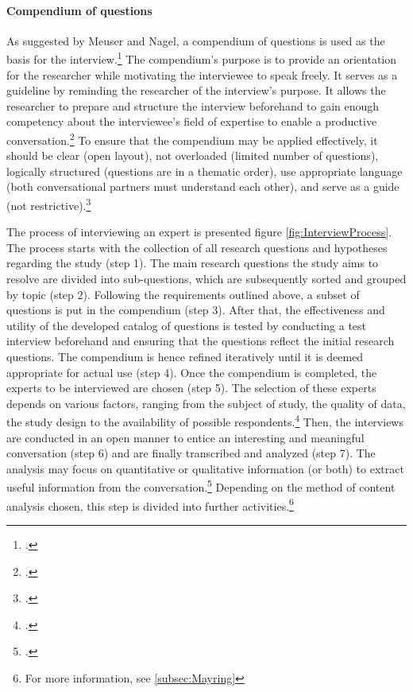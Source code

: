 \paragraph{Compendium of questions} As suggested by Meuser and Nagel, a compendium of questions is used as the basis for the interview.\footcite[Cf.][p.472]{MeuserExperteninterviewkonzeptionelleGrundlagen2009} The compendium's purpose is to provide an orientation for the researcher while motivating the interviewee to speak freely. It serves as a guideline by reminding the researcher of the interview's purpose. It allows the researcher to prepare and structure the interview beforehand to gain enough competency about the interviewee's field of expertise to enable a productive conversation.\footcites[Cf.][p.472 et seqq]{MeuserExperteninterviewkonzeptionelleGrundlagen2009}[cf.][p.133]{KrugerMethodennaturwissenschaftsdidaktischenForschung2014}[cf.][p.431 et seq]{BognerInterviewsmitExperten2014}[cf.][p.123 et seqq]{NiebertLeitfadengestutzteInterviews2014}[cf.][p.421]{AghamanoukjanQualitativeInterviews2007}
To ensure that the compendium may be applied effectively, it should be clear (open layout), not overloaded (limited number of questions), logically structured (questions are in a thematic order), use appropriate language (both conversational partners must understand each other), and serve as a guide (not restrictive).\footcite[Cf.][p.126]{NiebertLeitfadengestutzteInterviews2014}

The process of interviewing an expert is presented figure \ref{fig:InterviewProcess}. The process starts with the collection of all research questions and hypotheses regarding the study (step 1). The main research questions the study aims to resolve are divided into sub-questions, which are subsequently sorted and grouped by topic (step 2). Following the requirements outlined above, a subset of questions is put in the compendium (step 3). After that, the effectiveness and utility of the developed catalog of questions is tested by conducting a test interview beforehand and ensuring that the questions reflect the initial research questions. The compendium is hence refined iteratively until it is deemed appropriate for actual use (step 4). Once the compendium is completed, the experts to be interviewed are chosen (step 5). The selection of these experts depends on various factors, ranging from the subject of study, the quality of data, the study design to the availability of possible respondents.\footcites[Cf.][p.134]{KrugerqualitativeInhaltsanalyseMethode2004}[cf.][p.1 et seq.]{MorseDeterminingsamplesize2000}[cf.][p.137]{Flickintroductionqualitativeresearch2009} Then, the interviews are conducted in an open manner to entice an interesting and meaningful conversation (step 6) and are finally transcribed and analyzed (step 7). The analysis may focus on quantitative or qualitative information (or both) to extract useful information from the conversation.\footcites[Cf.][p.37 et seqq]{BognerInterviewsmitExperten2014}[cf.][p.454 et seqq]{MeuserExperteninterviewkonzeptionelleGrundlagen2009}[cf.][p.72]{MasonQualitativeresearching2002} Depending on the method of content analysis chosen, this step is divided into further activities.\footnote{For more information, see \ref{subsec:Mayring}}


